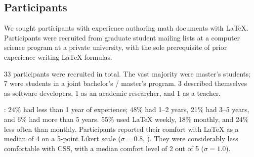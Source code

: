\subsection{Participants}\label{study-participants}

We sought participants with experience authoring math documents with LaTeX. Participants were recruited from graduate student mailing lists at a computer science program at a private university, with the sole prerequisite of prior experience writing LaTeX formulas.

33 participants were recruited in total. The vast majority were master's students; 7 were students in a joint bachelor's / master's program. 3 described themselves as software developers, 1 as an academic researcher, and 1 as a teacher.

: 24\% had less than 1 year of experience; 48\% had 1--2 years, 21\% had 3--5 years, and 6\% had more than 5 years. 55\% used LaTeX weekly, 18\% monthly, and 24\% less often than monthly. Participants reported their comfort with LaTeX as a median of 4 on a 5-point Likert scale ($\sigma = 0.8$, ). They were considerably less comfortable with CSS, with a median comfort level of 2 out of 5 ($\sigma = 1.0$).



